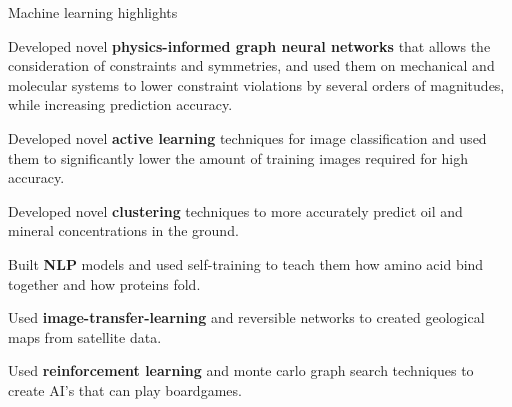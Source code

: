 


\begin{cventries}


  \cventry
    {Machine learning highlights} %
    {} %
    {} %
    {} %
    {
      \begin{cvitems} %
        \item {Developed novel \textbf{physics-informed graph neural networks} that allows the consideration of constraints and symmetries, and used them on mechanical and molecular systems to lower constraint violations by several orders of magnitudes, while increasing prediction accuracy.}
        \item {Developed novel \textbf{active learning} techniques for image classification and used them to significantly lower the amount of training images required for high accuracy.}
        \item {Developed novel \textbf{clustering} techniques to more accurately predict oil and mineral concentrations in the ground.}
        \item {Built \textbf{NLP} models and used self-training to teach them how amino acid bind together and how proteins fold.}
        \item {Used \textbf{image-transfer-learning} and reversible networks to created geological maps from satellite data.}
        \item {Used \textbf{reinforcement learning} and monte carlo graph search techniques to create AI's that can play boardgames.}
      \end{cvitems}
    }


\end{cventries}
